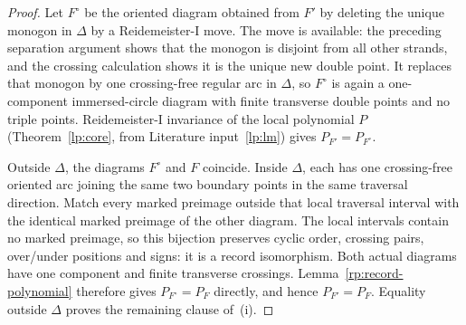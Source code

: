 \begin{proof}
Let $F^{\circ}$ be the oriented diagram obtained from $F'$ by deleting the
unique monogon in $\Delta$ by a Reidemeister-I move.  The move is available:
the preceding separation argument shows that the monogon is disjoint from
all other strands, and the crossing calculation shows it is the unique new
double point.  It replaces that monogon by one crossing-free regular arc in
$\Delta$, so $F^{\circ}$ is again a one-component immersed-circle diagram with
finite transverse double points and no triple points.  Reidemeister-I
invariance of the local polynomial $P$ (Theorem~\ref{lp:core}, from Literature
input~\ref{lp:lm}) gives $P_{F'}=P_{F^{\circ}}$.

Outside $\Delta$, the diagrams $F^{\circ}$ and $F$ coincide.  Inside
$\Delta$, each has one crossing-free oriented arc joining the same two
boundary points in the same traversal direction.  Match every marked
preimage outside that local traversal interval with the identical marked
preimage of the other diagram.  The local intervals contain no marked
preimage, so this bijection preserves cyclic order, crossing pairs,
over/under positions and signs: it is a record isomorphism.  Both actual diagrams have one component and finite transverse crossings.
Lemma~\ref{rp:record-polynomial} therefore gives
$P_{F^{\circ}}=P_F$ directly, and hence $P_{F'}=P_F$.
Equality outside $\Delta$ proves the
remaining clause of~(i).
\end{proof}

